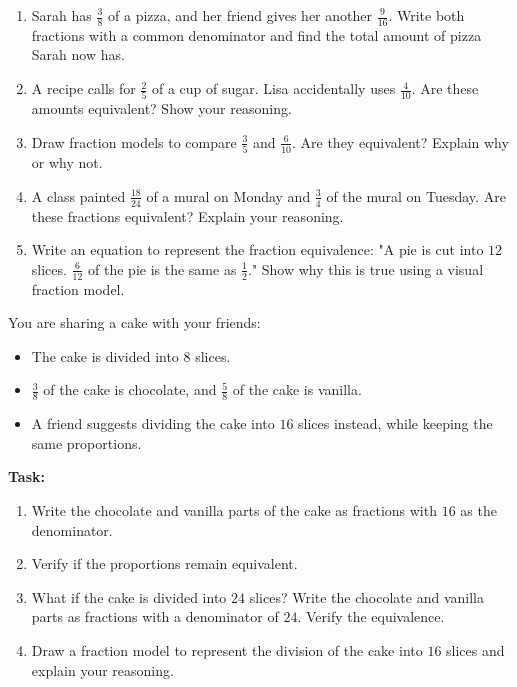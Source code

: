 \documentclass[12pt]{article}
\begin{document}
\begin{tcolorbox}[colframe=black!60, colback=white, 
coltitle=black, colbacktitle=black!15, fonttitle=\bfseries\Large, 
title=Problems, halign title=center, left=10pt, right=10pt, top=10pt, bottom=90pt]
\begin{enumerate}[start=9, itemsep=5em]
    \item Sarah has \( \frac{3}{8} \) of a pizza, and her friend gives her another \( \frac{9}{16} \). Write both fractions with a common denominator and find the total amount of pizza Sarah now has.
    \item A recipe calls for \( \frac{2}{5} \) of a cup of sugar. Lisa accidentally uses \( \frac{4}{10} \). Are these amounts equivalent? Show your reasoning.
    \item Draw fraction models to compare \( \frac{3}{5} \) and \( \frac{6}{10} \). Are they equivalent? Explain why or why not.
    \item A class painted \( \frac{18}{24} \) of a mural on Monday and \( \frac{3}{4} \) of the mural on Tuesday. Are these fractions equivalent? Explain your reasoning.
    \item Write an equation to represent the fraction equivalence: "A pie is cut into \( 12 \) slices. \( \frac{6}{12} \) of the pie is the same as \( \frac{1}{2} \)." Show why this is true using a visual fraction model.
\end{enumerate}
\end{tcolorbox}

\vspace{1em}

\begin{tcolorbox}[colframe=black!60, colback=white, 
coltitle=black, colbacktitle=black!15, fonttitle=\bfseries\Large, 
title=Performance Task: Sharing a Cake, halign title=center, left=10pt, right=10pt, top=10pt, bottom=50pt]
You are sharing a cake with your friends:
\begin{itemize}
    \item The cake is divided into \( 8 \) slices.
    \item \( \frac{3}{8} \) of the cake is chocolate, and \( \frac{5}{8} \) of the cake is vanilla.
    \item A friend suggests dividing the cake into \( 16 \) slices instead, while keeping the same proportions.
\end{itemize}
\textbf{Task:}
\begin{enumerate}[itemsep=3em]
    \item Write the chocolate and vanilla parts of the cake as fractions with \( 16 \) as the denominator.
    \item Verify if the proportions remain equivalent.
    \item What if the cake is divided into \( 24 \) slices? Write the chocolate and vanilla parts as fractions with a denominator of \( 24 \). Verify the equivalence.
    \item Draw a fraction model to represent the division of the cake into \( 16 \) slices and explain your reasoning.
\end{enumerate}
\end{tcolorbox}
\end{document}
